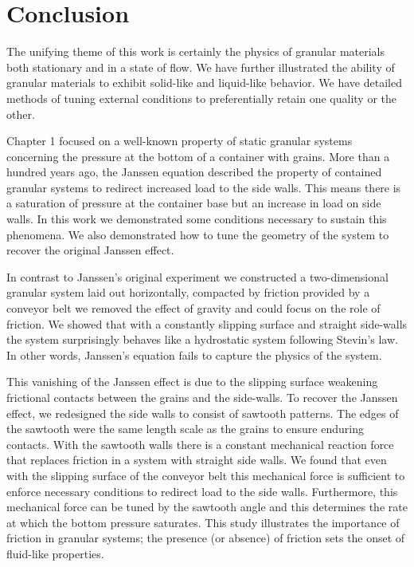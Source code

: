 \chapter{Conclusion}

The unifying theme of this work is certainly the physics of granular materials both stationary and in a state of flow. We have further illustrated the ability of granular materials to exhibit solid-like and liquid-like behavior. We have detailed methods of tuning external conditions to preferentially retain one quality or the other. 

Chapter 1 focused on a well-known property of static granular systems concerning the pressure at the bottom of a container with grains. More than a hundred years ago, the Janssen equation described the property of contained granular systems to redirect increased load to the side walls. This means there is a saturation of pressure at the container base but an increase in load on side walls. In this work we demonstrated some conditions necessary to sustain this phenomena. We also demonstrated how to tune the geometry of the system to recover the original Janssen effect. 

In contrast to Janssen's original experiment we constructed a two-dimensional granular system laid out horizontally, compacted by friction provided by a conveyor belt we removed the effect of gravity and could focus on the role of friction. We showed that with a constantly slipping surface and straight side-walls the system surprisingly behaves like a hydrostatic system following Stevin's law. In other words, Janssen's equation fails to capture the physics of the system. 

This vanishing of the Janssen effect is due to the slipping surface weakening frictional contacts between the grains and the side-walls. To recover the Janssen effect, we redesigned the side walls to consist of sawtooth patterns. The edges of the sawtooth were the same length scale as the grains to ensure enduring contacts. With the sawtooth walls there is a constant mechanical reaction force that replaces friction in a system with straight side walls. We found that even with the slipping surface of the conveyor belt this mechanical force is sufficient to enforce necessary conditions to redirect load to the side walls. Furthermore, this mechanical force can be tuned by the sawtooth angle and this determines the rate at which the bottom pressure saturates. This study illustrates the importance of friction in granular systems; the presence (or absence) of friction sets the onset of fluid-like properties. 

